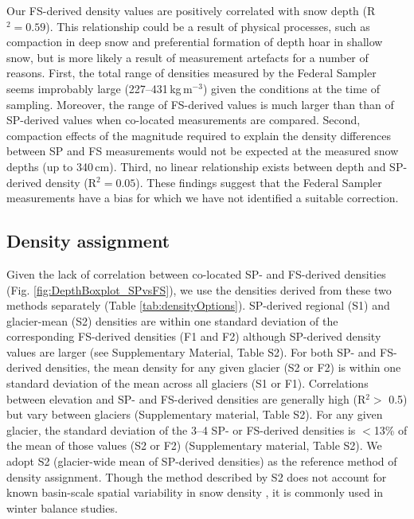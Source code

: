 \documentclass[review,oneside, letterpaper]{igs}
\begin{document}
Our FS-derived density values are positively correlated with snow depth (R$^2= 0.59$). This relationship could be a result of physical processes, such as compaction in deep snow and preferential formation of depth hoar in shallow snow, but is more likely a result of measurement artefacts for a number of reasons. First, the total range of densities measured by the Federal Sampler seems improbably large (227--431\,kg\,m$^{-3}$) given the conditions at the time of sampling. Moreover, the range of FS-derived values is much larger than than of SP-derived values when co-located measurements are compared. Second, compaction effects of the magnitude required to explain the density differences between SP and FS measurements would not be expected at the measured snow depths (up to 340\,cm). Third, no linear relationship exists between depth and SP-derived density (R$^2 = 0.05$). These findings suggest that the Federal Sampler measurements have a bias for which we have not identified a suitable correction.

\subsection{Density assignment}

Given the lack of correlation between co-located SP- and FS-derived densities (Fig. \ref{fig:DepthBoxplot_SPvsFS}), we use the densities derived from these two methods separately (Table \ref{tab:densityOptions}). SP-derived regional (S1) and glacier-mean (S2) densities are within one standard deviation of the corresponding FS-derived densities (F1 and F2) although SP-derived density values are larger (see Supplementary Material, Table S2). For both SP- and FS-derived densities, the mean density for any given glacier (S2 or F2) is within one standard deviation of the mean across all glaciers (S1 or F1). Correlations between elevation and SP- and FS-derived densities are generally high (R$^2>$ 0.5) but vary between glaciers (Supplementary material, Table S2). For any given glacier, the standard deviation of the 3--4 SP- or FS-derived densities is $<$13\% of the mean of those values (S2 or F2) (Supplementary material, Table S2). We adopt S2 (glacier-wide mean of SP-derived densities) as the reference method of density assignment. Though the method described by S2 does not account for known basin-scale spatial variability in snow density \citep[e.g.][]{Wetlaufer2016}, it is commonly used in winter balance studies\citep[e.g.][]{Elder1991,McGrath2015,Cullen2017}. 
\end{document}
